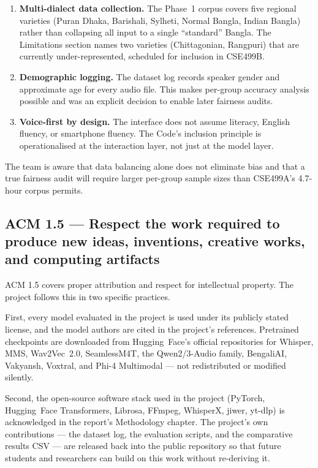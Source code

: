 \documentclass[12pt,a4paper]{article}
\begin{document}
\begin{enumerate}[leftmargin=*]
\item \textbf{Multi-dialect data collection.} The Phase~1 corpus
covers five regional varieties (Puran Dhaka, Barishali, Sylheti,
Normal Bangla, Indian Bangla) rather than collapsing all input to a
single ``standard'' Bangla. The Limitations section names two
varieties (Chittagonian, Rangpuri) that are currently
under-represented, scheduled for inclusion in CSE499B.
\item \textbf{Demographic logging.} The dataset log records speaker
gender and approximate age for every audio file. This makes
per-group accuracy analysis possible and was an explicit decision
to enable later fairness audits.
\item \textbf{Voice-first by design.} The interface does not assume
literacy, English fluency, or smartphone fluency. The Code's
inclusion principle is operationalised at the interaction layer,
not just at the model layer.
\end{enumerate}

The team is aware that data balancing alone does not eliminate bias
and that a true fairness audit will require larger per-group sample
sizes than CSE499A's 4.7-hour corpus permits.

\subsection{ACM 1.5 --- Respect the work required to produce new
ideas, inventions, creative works, and computing artifacts}

ACM 1.5 covers proper attribution and respect for intellectual
property. The project follows this in two specific practices.

First, every model evaluated in the project is used under its
publicly stated license, and the model authors are cited in the
project's references. Pretrained checkpoints are downloaded from
Hugging~Face's official repositories for Whisper, MMS, Wav2Vec~2.0,
SeamlessM4T, the Qwen2/3-Audio family, BengaliAI, Vakyansh, Voxtral,
and Phi-4 Multimodal --- not redistributed or modified silently.

Second, the open-source software stack used in the project (PyTorch,
Hugging~Face Transformers, Librosa, FFmpeg, WhisperX, jiwer, yt-dlp)
is acknowledged in the report's Methodology chapter. The project's
own contributions --- the dataset log, the evaluation scripts, and
the comparative results CSV --- are released back into the public
repository so that future students and researchers can build on
this work without re-deriving it.
\end{document}
